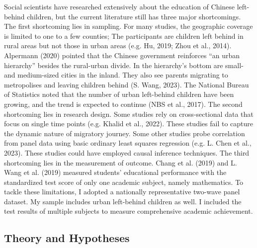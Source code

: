 \documentclass[
  man,floatsintext]{apa7}
\begin{document}
Social scientists have researched extensively about the education of Chinese left-behind children, but the current literature still has three major shortcomings. The first shortcoming lies in sampling. For many studies, the geographic coverage is limited to one to a few counties; The participants are children left behind in rural areas but not those in urban areas (e.g. Hu, 2019; Zhou et al., 2014). Alpermann (2020) pointed that the Chinese government reinforces ``an urban hierarchy'' besides the rural-urban divide. In the hierarchy's bottom are small- and medium-sized cities in the inland. They also see parents migrating to metropolises and leaving children behind (S. Wang, 2023). The National Bureau of Statistics noted that the number of urban left-behind children have been growing, and the trend is expected to continue (NBS et al., 2017). The second shortcoming lies in research design. Some studies rely on cross-sectional data that focus on single time points (e.g. Khalid et al., 2022). These studies fail to capture the dynamic nature of migratory journey. Some other studies probe correlation from panel data using basic ordinary least squares regression (e.g. L. Chen et al., 2023). These studies could have employed causal inference techniques. The third shortcoming lies in the measurement of outcome. Chang et al. (2019) and L. Wang et al. (2019) measured students' educational performance with the standardized test score of only one academic subject, namely mathematics. To tackle these limitations, I adopted a nationally representative two-wave panel dataset. My sample includes urban left-behind children as well. I included the test results of multiple subjects to measure comprehensive academic achievement.

\hypertarget{theory-and-hypotheses}{%
\subsection{Theory and Hypotheses}\label{theory-and-hypotheses}}
\end{document}
